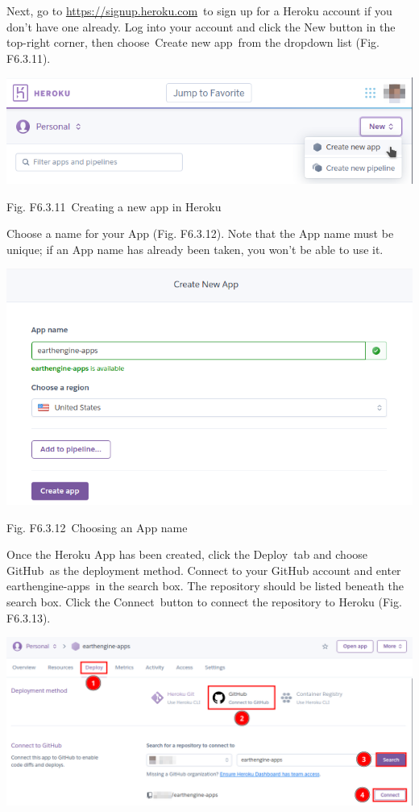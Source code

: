 \documentclass[
  letterpaper,
  DIV=11,
  numbers=noendperiod]{scrreprt}
\begin{document}
Next, go to
\href{https://www.google.com/url?q=https://signup.heroku.com\&sa=D\&source=editors\&ust=1671458841338152\&usg=AOvVaw03SbXy3optdTU9A2yG-bBq}{https://signup.heroku.com}~to
sign up for a Heroku account if you don't have one already. Log into
your account and click the New button in the top-right corner, then
choose~Create new app~from the dropdown list (Fig. F6.3.11).

\includegraphics{./F6/image5.png}

Fig. F6.3.11~Creating a new app in Heroku

Choose a name for your App (Fig. F6.3.12). Note that the App name must
be unique; if an App name has already been taken, you won't be able to
use it.

\includegraphics{./F6/image73.png}

Fig. F6.3.12~Choosing an App name

Once the Heroku App has been created, click the Deploy~tab and choose
GitHub~as the deployment method. Connect to your GitHub account and
enter earthengine-apps~in the search box. The repository should be
listed beneath the search box. Click the Connect~button to connect the
repository to Heroku (Fig. F6.3.13).

\includegraphics{./F6/image27.png}
\end{document}

